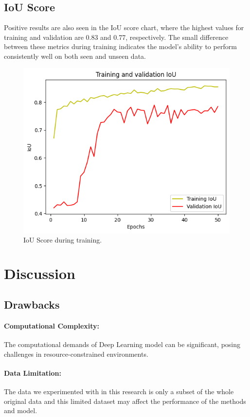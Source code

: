 \documentclass[]{acmsiggraph}
\begin{document}
\subsection{IoU Score}
Positive results are also seen in the IoU score chart, where the highest values for training and validation are 0.83 and 0.77, respectively. The small difference between these metrics during training indicates the model's ability to perform consistently well on both seen and unseen data.

\begin{figure}[h]\centering
 \includegraphics[width=0.75\linewidth]{images/iou.png}
 \caption{\label{fig:reference}IoU Score during training.}
\end{figure}
\section{Discussion}

\subsection{Drawbacks}

\paragraph{Computational Complexity:}The computational demands of Deep Learning model can be significant, posing challenges in resource-constrained environments.

\paragraph{Data Limitation:}The data we experimented with in this research is only a subset of the whole original data and this limited dataset may affect the performance of the methods and model. 
\end{document}
